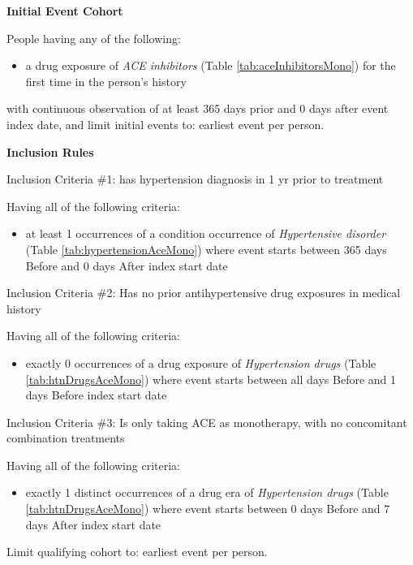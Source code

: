 \documentclass[11pt]{book}
\providecommand{\tightlist}{%
  \setlength{\itemsep}{0pt}\setlength{\parskip}{0pt}}
\begin{document}
\textbf{Initial Event Cohort}

People having any of the following:

\begin{itemize}
\tightlist
\item
  a drug exposure of \emph{ACE inhibitors} (Table
  \ref{tab:aceInhibitorsMono}) for the first time in the person's
  history
\end{itemize}

with continuous observation of at least 365 days prior and 0 days after
event index date, and limit initial events to: earliest event per
person.

\textbf{Inclusion Rules}

Inclusion Criteria \#1: has hypertension diagnosis in 1 yr prior to
treatment

Having all of the following criteria:

\begin{itemize}
\tightlist
\item
  at least 1 occurrences of a condition occurrence of \emph{Hypertensive
  disorder} (Table \ref{tab:hypertensionAceMono}) where event starts
  between 365 days Before and 0 days After index start date
\end{itemize}

Inclusion Criteria \#2: Has no prior antihypertensive drug exposures in
medical history

Having all of the following criteria:

\begin{itemize}
\tightlist
\item
  exactly 0 occurrences of a drug exposure of \emph{Hypertension drugs}
  (Table \ref{tab:htnDrugsAceMono}) where event starts between all days
  Before and 1 days Before index start date
\end{itemize}

Inclusion Criteria \#3: Is only taking ACE as monotherapy, with no
concomitant combination treatments

Having all of the following criteria:

\begin{itemize}
\tightlist
\item
  exactly 1 distinct occurrences of a drug era of \emph{Hypertension
  drugs} (Table \ref{tab:htnDrugsAceMono}) where event starts between 0
  days Before and 7 days After index start date
\end{itemize}

Limit qualifying cohort to: earliest event per person.
\end{document}
